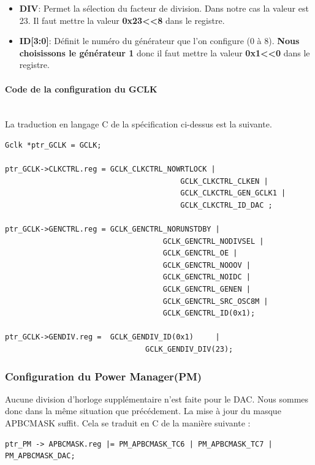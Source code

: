 \documentclass[a4paper]{article}
\begin{document}
\begin{itemize}
	\item {\bf DIV}: Permet la sélection du facteur de division. Dans notre cas la valeur est 23. Il faut mettre la valeur {\bf 0x23\textless\textless8} dans le registre.\\
	\item {\bf ID[3:0]}: Définit le numéro du générateur que l'on configure (0 à 8). \textbf{Nous choisissons le générateur 1} donc il faut mettre la valeur {\bf 0x1\textless\textless0} dans le registre.

\end{itemize}



\paragraph{Code de la configuration du GCLK} ~~\\

La traduction en langage C de la spécification ci-dessus est la suivante.

\begin{lstlisting}[style=CStyle]
Gclk *ptr_GCLK = GCLK;
						
ptr_GCLK->CLKCTRL.reg = GCLK_CLKCTRL_NOWRTLOCK |
										GCLK_CLKCTRL_CLKEN |
										GCLK_CLKCTRL_GEN_GCLK1 |
										GCLK_CLKCTRL_ID_DAC ;

ptr_GCLK->GENCTRL.reg = GCLK_GENCTRL_NORUNSTDBY |
									GCLK_GENCTRL_NODIVSEL |
									GCLK_GENCTRL_OE |
									GCLK_GENCTRL_NOOOV |
									GCLK_GENCTRL_NOIDC |
									GCLK_GENCTRL_GENEN |
									GCLK_GENCTRL_SRC_OSC8M |
									GCLK_GENCTRL_ID(0x1);

ptr_GCLK->GENDIV.reg =	GCLK_GENDIV_ID(0x1)		|
								GCLK_GENDIV_DIV(23);
\end{lstlisting}

\newpage
\subsubsection{Configuration du Power Manager(PM)}
Aucune division d'horloge supplémentaire n'est faite pour le DAC. Nous sommes donc dans la même situation que précédement. La mise à jour du masque APBCMASK suffit. Cela se traduit en C de la manière suivante :
\begin{lstlisting}[style=CStyle]
ptr_PM -> APBCMASK.reg |= PM_APBCMASK_TC6 | PM_APBCMASK_TC7 | PM_APBCMASK_DAC;
\end{lstlisting}
\end{document}
